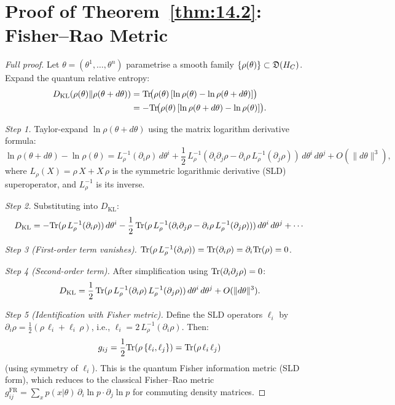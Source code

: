\section{Proof of Theorem~\ref{thm:14.2}: Fisher--Rao Metric}
\label{app:pf-fisher}

\begin{proof}[Full proof]
Let $\theta = (\theta^1, \ldots, \theta^n)$ parametrise a smooth
family $\{\rho(\theta)\} \subset \mathfrak{D}(H_C)$.  Expand the
quantum relative entropy:
\begin{align*}
  D_{\mathrm{KL}}(\rho(\theta) \| \rho(\theta + d\theta))
  &= \mathrm{Tr}\!\big(\rho(\theta)\,
    [\ln\rho(\theta) - \ln\rho(\theta + d\theta)]\big) \\
  &= -\mathrm{Tr}\!\big(\rho(\theta)\,
    [\ln\rho(\theta + d\theta) - \ln\rho(\theta)]\big).
\end{align*}

\emph{Step 1.} Taylor-expand $\ln\rho(\theta + d\theta)$ using the
matrix logarithm derivative formula:
\[
  \ln\rho(\theta + d\theta) - \ln\rho(\theta)
  = L_\rho^{-1}(\partial_i\rho)\,d\theta^i
  + \frac{1}{2}\,L_\rho^{-1}(\partial_i\partial_j\rho
  - \partial_i\rho\,L_\rho^{-1}(\partial_j\rho))\,
  d\theta^i\,d\theta^j + O(\|d\theta\|^3),
\]
where $L_\rho(X) = \rho\,X + X\,\rho$ is the symmetric logarithmic
derivative (SLD) superoperator, and
$L_\rho^{-1}$ is its inverse.

\emph{Step 2.} Substituting into $D_{\mathrm{KL}}$:
\[
  D_{\mathrm{KL}} = -\mathrm{Tr}(\rho\,L_\rho^{-1}(\partial_i\rho))\,d\theta^i
  - \frac{1}{2}\,\mathrm{Tr}(\rho\,L_\rho^{-1}(\partial_i\partial_j\rho
  - \partial_i\rho\,L_\rho^{-1}(\partial_j\rho)))\,
  d\theta^i\,d\theta^j + \cdots
\]

\emph{Step 3 (First-order term vanishes).}
$\mathrm{Tr}(\rho\,L_\rho^{-1}(\partial_i\rho)) =
\mathrm{Tr}(\partial_i\rho) = \partial_i\mathrm{Tr}(\rho) = 0$.

\emph{Step 4 (Second-order term).}
After simplification using $\mathrm{Tr}(\partial_i\partial_j\rho) = 0$:
\[
  D_{\mathrm{KL}} = \frac{1}{2}\,
  \mathrm{Tr}(\rho\,L_\rho^{-1}(\partial_i\rho)\,
  L_\rho^{-1}(\partial_j\rho))\,
  d\theta^i\,d\theta^j + O(\|d\theta\|^3).
\]

\emph{Step 5 (Identification with Fisher metric).}
Define the SLD operators $\ell_i$ by
$\partial_i\rho = \frac{1}{2}(\rho\,\ell_i + \ell_i\,\rho)$,
i.e., $\ell_i = 2\,L_\rho^{-1}(\partial_i\rho)$.  Then:
\[
  g_{ij} = \frac{1}{2}\mathrm{Tr}(\rho\,\{\ell_i, \ell_j\})
  = \mathrm{Tr}(\rho\,\ell_i\,\ell_j)
\]
(using symmetry of $\ell_i$).  This is the quantum Fisher
information metric (SLD form), which reduces to the classical
Fisher--Rao metric $g_{ij}^{\mathrm{FR}} =
\sum_x p(x|\theta)\,\partial_i\ln p \cdot \partial_j\ln p$
for commuting density matrices.
\end{proof}

